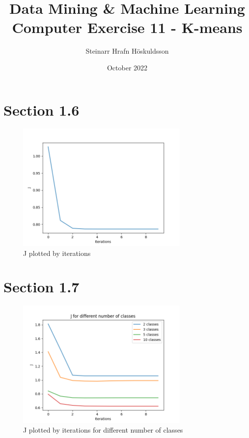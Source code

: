 \documentclass{article}
\title{Data Mining \& Machine Learning \\ \large Computer Exercise 11 - K-means}
\author{Steinarr Hrafn Höskuldsson}
\date{October 2022}
\newcommand{\mycomment}[1]{}
\begin{document}
\maketitle
\mycomment{
\begin{figure}[h]
    \centering
    \texttt{[image: LAB3/Basic1.png]}
    \caption{"Switch test" Breadboard set up}
    \label{fig:Switch_test}
\end{figure}



}

\section*{Section 1.6}
\begin{figure}[h]
    \centering
    \includegraphics[width=0.75\textwidth]{11_k_means/1_6_1.png}
    \caption{J plotted by iterations}
    \label{fig:16}
\end{figure}

\section*{Section 1.7}
\begin{figure}[h]
    \centering
    \includegraphics[width=0.75\textwidth]{11_k_means/1_7_1.png}
    \caption{J plotted by iterations for different number of classes}
    \label{fig:16}
\end{figure}
\end{document}
